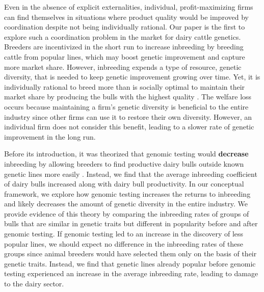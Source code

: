 \documentclass[12pt,letterpaper]{article}
\begin{document}
Even in the absence of explicit externalities, individual, profit-maximizing firms can find themselves in situations where product quality would be improved by coordination despite not being individually rational.
Our paper is the first to explore such a coordination problem in the market for dairy cattle genetics.
Breeders are incentivized in the short run to increase inbreeding by breeding cattle from popular lines, which may boost genetic improvement and capture more market share.
However, inbreeding expends a type of resource, genetic diversity, that is needed to keep genetic improvement growing over time.
Yet, it is individually rational to breed more than is socially optimal to maintain their market share by producing the bulls with the highest quality \citep{Cole2019}.
The welfare loss occurs because maintaining a firm's genetic diversity is beneficial to the entire industry since other firms can use it to restore their own diversity.
However, an individual firm does not consider this benefit, leading to a slower rate of genetic improvement in the long run.



Before its introduction, it was theorized that genomic testing would \textbf{decrease} inbreeding by allowing breeders to find productive dairy bulls outside known genetic lines more easily \citep{Daetwyler2007}. 
Instead, we find that the average inbreeding coefficient of dairy bulls increased along with dairy bull productivity.
In our conceptual framework, we explore how genomic testing increases the returns to inbreeding and likely decreases the amount of genetic diversity in the entire industry.
We provide evidence of this theory by comparing the inbreeding rates of groups of bulls that are similar in genetic traits but different in popularity before and after genomic testing.
If genomic testing led to an increase in the discovery of less popular lines, we should expect no difference in the inbreeding rates of these groups since animal breeders would have selected them only on the basis of their genetic traits.
Instead, we find that genetic lines already popular before genomic testing experienced an increase in the average inbreeding rate, leading to damage to the dairy sector.
\end{document}
